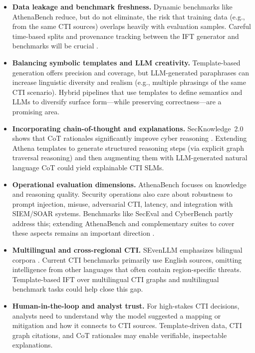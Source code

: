 \documentclass[unnumsec,webpdf,contemporary,large]{oup-authoring-template}
\theoremstyle{thmstyleone}
\theoremstyle{thmstyletwo}
\theoremstyle{thmstylethree}
\begin{document}
\begin{itemize}
  \item \textbf{Data leakage and benchmark freshness.} Dynamic benchmarks like AthenaBench reduce, but do not eliminate, the risk that training data (e.g., from the same CTI sources) overlaps heavily with evaluation samples. Careful time-based splits and provenance tracking between the IFT generator and benchmarks will be crucial \cite{alam2025athenabench,cardei2025ift}.
  \item \textbf{Balancing symbolic templates and LLM creativity.} Template-based generation offers precision and coverage, but LLM-generated paraphrases can increase linguistic diversity and realism (e.g., multiple phrasings of the same CTI scenario). Hybrid pipelines that use templates to define semantics and LLMs to diversify surface form---while preserving correctness---are a promising area.
  \item \textbf{Incorporating chain-of-thought and explanations.} SecKnowledge~2.0 shows that CoT rationales significantly improve cyber reasoning \cite{levi2025toward}. Extending Athena templates to generate structured reasoning steps (via explicit graph traversal reasoning) and then augmenting them with LLM-generated natural language CoT could yield explainable CTI SLMs.
  \item \textbf{Operational evaluation dimensions.} AthenaBench focuses on knowledge and reasoning quality. Security operations also care about robustness to prompt injection, misuse, adversarial CTI, latency, and integration with SIEM/SOAR systems. Benchmarks like SecEval and CyberBench partly address this; extending AthenaBench and complementary suites to cover these aspects remains an important direction \cite{hu2024seceval,liu2024cyberbench,alam2025athenabench}.
  \item \textbf{Multilingual and cross-regional CTI.} SEvenLLM emphasizes bilingual corpora \cite{ji2024sevenllm}. Current CTI benchmarks primarily use English sources, omitting intelligence from other languages that often contain region-specific threats. Template-based IFT over multilingual CTI graphs and multilingual benchmark tasks could help close this gap.
  \item \textbf{Human-in-the-loop and analyst trust.} For high-stakes CTI decisions, analysts need to understand why the model suggested a mapping or mitigation and how it connects to CTI sources. Template-driven data, CTI graph citations, and CoT rationales may enable verifiable, inspectable explanations.
\end{itemize}
\end{document}
